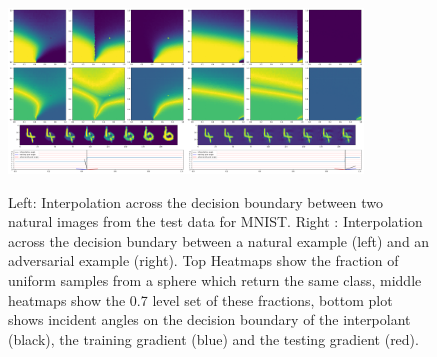 \begin{figure}[ht!]
    \centering
    \includegraphics[width=0.42\textwidth]{c5_figures/stab-mnist-C32-50-50-10-0.001-eval-1e-06-none-4-6-db_interp-stability-50.png}\includegraphics[width=0.42\textwidth]{c5_figures/stab-mnist-C32-50-50-10-0.001-eval-1e-06-pgd-4-6-db_interp-stability-50.png}

    \caption{Left: Interpolation across the decision boundary between
      two natural images from the test data for MNIST. Right :
      Interpolation across the decision bundary between a natural
      example (left) and an adversarial example (right). Top Heatmaps
      show the fraction of uniform samples from a sphere which return
      the same class, middle  heatmaps show the 0.7 level set of these
      fractions, bottom plot shows incident angles on the decision
      boundary of the interpolant (black), the training gradient
      (blue) and the testing gradient (red). }
    \label{fig:dbs}
\end{figure}


